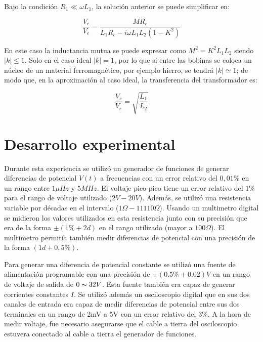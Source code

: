 \documentclass[11pt,a4paper]{article}
\begin{document}
Bajo la condición $R_1 \ll \omega L_1$, la solución anterior se puede simplificar en:

\begin{equation}
\frac{V_c}{V_e}=\frac{MR_c}{L_1R_c-i\omega L_1L_2(1-K^2)}
\label{transf_2}
\end{equation}

En este caso la inductancia mutua se puede expresar como $M^2=K^2L_1L_2$ siendo $\vert k\vert\leq1$. Solo en el caso ideal $\vert k\vert = 1$, por lo que si entre las bobinas se coloca un núcleo de un material ferromagnético, por ejemplo hierro, se tendrá $\vert k\vert \simeq 1$; de modo que, en la aproximación al caso ideal, la transferencia del transformador es:

\begin{equation}
\frac{V_c}{V_e}= \sqrt{\frac{L_1}{L_2}}
\label{trans_3}
\end{equation}




\section{Desarrollo experimental}

Durante esta experiencia se utilizó un generador de funciones de generar diferencias de potencial $V(t)$ a frecuencias con un error relativo del $0,01\%$ en un rango entre $1\mu Hz$ y $5MHz$. El voltaje pico-pico tiene un error relativo del $1\%$ para el rango de voltaje utilizado ($2V-20V$). Además, se utilizó una resistencia variable por décadas en el intervalo ($1\Omega-11110\Omega$). Usando un multimetro digital se midieron los valores utilizados en esta resistencia junto con su precisión que era de la forma $\pm(1\%+2d)$ en el rango utilizado (mayor a $100\Omega$). El multimetro permitía también medir diferencias de potencial con una precisión de la forma $(1d+0,5\%)$.

Para generar una diferencia de potencial constante se utilizó una fuente de alimentación programable con una precisión de $\pm (0.5\% + 0.02)V$ en un rango de voltaje de salida de $0 \thicksim 32 V$. Esta fuente también era capaz de generar corrientes constantes $I$. Se utilizó además un osciloscopio digital que en sus dos canales de entrada era capaz de medir diferencias de potencial entre sus dos terminales en un rango de 2mV a 5V con un error relativo del $3\%$. A la hora de medir voltaje, fue necesario asegurarse que el cable a tierra del osciloscopio estuvera conectado al cable a tierra el generador de funciones. 
\end{document}
